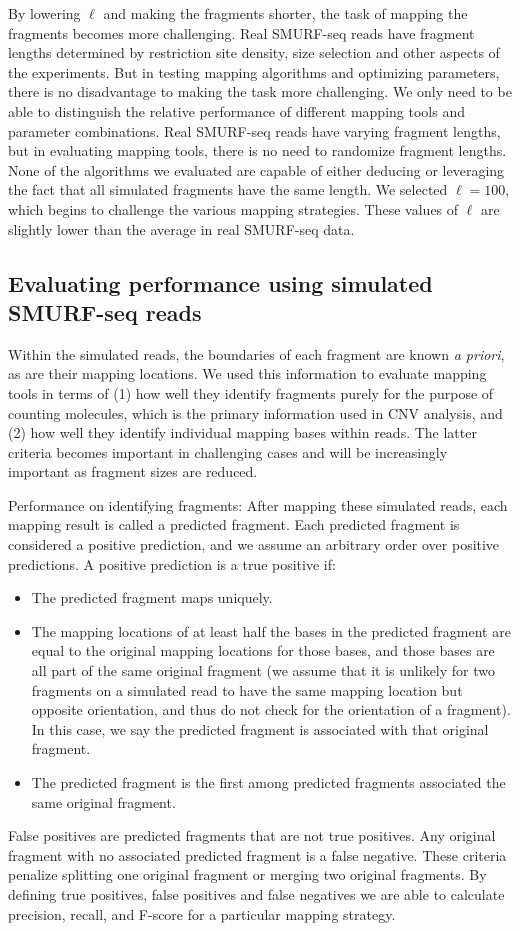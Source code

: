 By lowering $\ell$ and making the fragments shorter, the task of
mapping the fragments becomes more challenging. Real SMURF-seq reads
have fragment lengths determined by restriction site density, size
selection and other aspects of the experiments. But in testing mapping
algorithms and optimizing parameters, there is no disadvantage to
making the task more challenging. We only need to be able to
distinguish the relative performance of different mapping tools and
parameter combinations. Real SMURF-seq reads have varying fragment
lengths, but in evaluating mapping tools, there is no need to
randomize fragment lengths. None of the algorithms we evaluated are
capable of either deducing or leveraging the fact that all simulated
fragments have the same length. We selected $\ell = 100$, which
begins to challenge the various mapping strategies. These values of
$\ell$ are slightly lower than the average in real SMURF-seq data.


\subsection{Evaluating performance using simulated SMURF-seq reads}
Within the simulated reads, the boundaries of each fragment are known
\textit{a priori}, as are their mapping locations. We used this
information to evaluate mapping tools in terms of (1) how well they
identify fragments purely for the purpose of counting molecules, which
is the primary information used in CNV analysis, and (2) how well they
identify individual mapping bases within reads. The latter criteria
becomes important in challenging cases and will be increasingly
important as fragment sizes are reduced.

Performance on identifying fragments: After mapping these simulated
reads, each mapping result is called a predicted fragment. Each
predicted fragment is considered a positive prediction, and we assume
an arbitrary order over positive predictions. A positive prediction is
a true positive if:
\begin{itemize}
\item The predicted fragment maps uniquely.
\item The mapping locations of at least half the bases in the
  predicted fragment are equal to the original mapping locations for
  those bases, and those bases are all part of the same original
  fragment (we assume that it is unlikely for two fragments on a simulated
  read to have the same mapping location but opposite orientation, and thus
  do not check for the orientation of a fragment). In this case, we say the
  predicted fragment is associated with that original fragment.
\item The predicted fragment is the first among predicted fragments
  associated the same original fragment.
\end{itemize}
False positives are predicted fragments that are not true positives. Any
original fragment with no associated predicted fragment is a false
negative. These criteria penalize splitting one original fragment or
merging two original fragments. By defining true positives, false
positives and false negatives we are able to calculate precision,
recall, and F-score for a particular mapping strategy.

